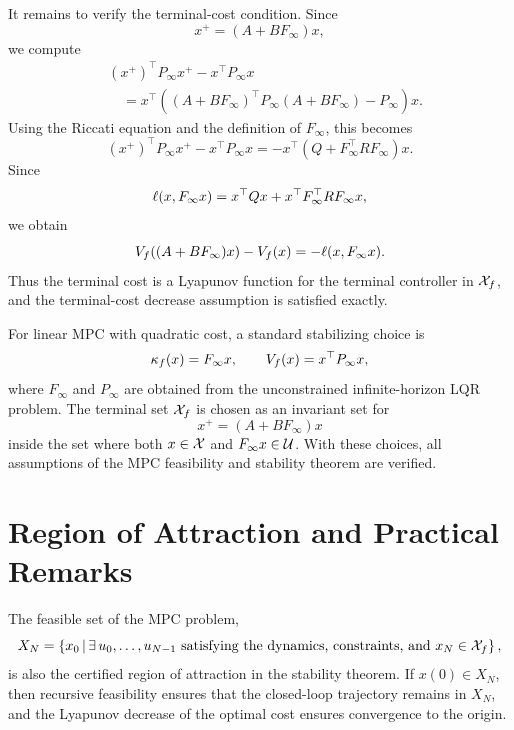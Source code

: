 It remains to verify the terminal-cost condition. Since
\[
    x^+=(A+BF_\infty)x,
\]
we compute
\[
\begin{aligned}
    &(x^+)^\top P_\infty x^+ - x^\top P_\infty x\\
    &\quad =
    x^\top
    \left(
        (A+BF_\infty)^\top P_\infty (A+BF_\infty)
        -
        P_\infty
    \right)x.
\end{aligned}
\]
Using the Riccati equation and the definition of \(F_\infty\), this becomes
\[
    (x^+)^\top P_\infty x^+ - x^\top P_\infty x
    =
    -x^\top\left(Q+F_\infty^\top R F_\infty\right)x.
\]
Since
\[
    \ell(x,F_\infty x)
    =
    x^\top Qx + x^\top F_\infty^\top R F_\infty x,
\]
we obtain
\[
    V_f((A+BF_\infty)x)-V_f(x)
    =
    -\ell(x,F_\infty x).
\]
Thus the terminal cost is a Lyapunov function for the terminal controller in \(\mathcal{X}_f\), and the
terminal-cost decrease assumption is satisfied exactly.

\begin{theorembox}
For linear MPC with quadratic cost, a standard stabilizing choice is
\[
    \kappa_f(x)=F_\infty x,
    \qquad
    V_f(x)=x^\top P_\infty x,
\]
where \(F_\infty\) and \(P_\infty\) are obtained from the unconstrained infinite-horizon LQR
problem. The terminal set \(\mathcal{X}_f\) is chosen as an invariant set for
\[
    x^+=(A+BF_\infty)x
\]
inside the set where both \(x\in\mathcal{X}\) and \(F_\infty x\in\mathcal{U}\). With these choices, all assumptions
of the MPC feasibility and stability theorem are verified.
\end{theorembox}

\section{Region of Attraction and Practical Remarks}

The feasible set of the MPC problem,
\[
    X_N
    =
    \left\{
        x_0
        \,\middle|\,
        \exists\, u_0,\ldots,u_{N-1}
        \text{ satisfying the dynamics, constraints, and } x_N\in\mathcal{X}_f
    \right\},
\]
is also the certified region of attraction in the stability theorem. If \(x(0)\in X_N\), then
recursive feasibility ensures that the closed-loop trajectory remains in \(X_N\), and the
Lyapunov decrease of the optimal cost ensures convergence to the origin.\\

